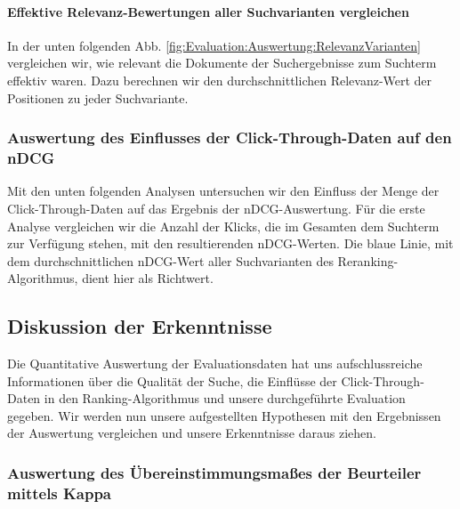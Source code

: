 

\paragraph{Effektive Relevanz-Bewertungen aller Suchvarianten vergleichen}
In der unten folgenden Abb. \ref{fig:Evaluation:Auswertung:RelevanzVarianten} vergleichen wir, wie relevant die Dokumente der Suchergebnisse zum Suchterm effektiv waren. Dazu berechnen wir den durchschnittlichen Relevanz-Wert der Positionen zu jeder Suchvariante.



\subsubsection{Auswertung des Einflusses der Click-Through-Daten auf den nDCG}
\label{sec:Evaluation:Auswertung:QuantitativeAuswertung:EinflussNDCG}

Mit den unten folgenden Analysen untersuchen wir den Einfluss der Menge der Click-Through-Daten auf das Ergebnis der nDCG-Auswertung. Für die erste Analyse vergleichen wir die Anzahl der Klicks, die im Gesamten dem Suchterm zur Verfügung stehen, mit den resultierenden nDCG-Werten. Die blaue Linie, mit dem durchschnittlichen nDCG-Wert aller Suchvarianten des Reranking-Algorithmus, dient hier als Richtwert.



\pagebreak

\subsection{Diskussion der Erkenntnisse}
\label{sec:Evaluation:Auswertung:Diskussion}

Die Quantitative Auswertung der Evaluationsdaten hat uns aufschlussreiche Informationen über die Qualität der Suche, die Einflüsse der Click-Through-Daten in den Ranking-Algorithmus und unsere durchgeführte Evaluation gegeben. Wir werden nun unsere aufgestellten Hypothesen mit den Ergebnissen der Auswertung vergleichen und unsere Erkenntnisse daraus ziehen.

\subsubsection{Auswertung des Übereinstimmungsmaßes der Beurteiler mittels Kappa}
\label{sec:Evaluation:Auswertung:Diskussion:Kappa}

